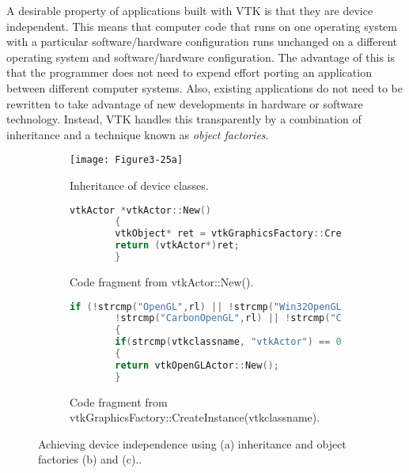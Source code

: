 A desirable property of applications built with VTK is that they are device independent. This means that computer code that runs on one operating system with a particular software/hardware configuration runs unchanged on a different operating system and software/hardware configuration. The advantage of this is that the programmer does not need to expend effort porting an application between different computer systems. Also, existing applications do not need to be rewritten to take advantage of new developments in hardware or software technology. Instead, VTK handles this transparently by a combination of inheritance and a technique known as \emph{object factories}.

\begin{figure}[!htb]
    \begin{subfigure}[h]{0.96\linewidth}
        \texttt{[image: Figure3-25a]}
        \caption{Inheritance of device classes.}
        \label{fig:Figure3-25a}
    \end{subfigure}
    \hfill
    \begin{subfigure}[h]{0.96\linewidth}
        \caption*{}
    \end{subfigure}
    \hfill
    \begin{subfigure}[h]{0.96\linewidth}
        \begin{lstlisting}[language=C++, caption={}]
        vtkActor *vtkActor::New()
        {
        vtkObject* ret = vtkGraphicsFactory::CreateInstance("vtkActor");
        return (vtkActor*)ret;
        }
        \end{lstlisting}
        \caption{Code fragment from vtkActor::New().}
        \label{fig:Figure3-25b}
    \end{subfigure}
    \hfill
    \begin{subfigure}[h]{0.96\linewidth}
        \caption*{}
    \end{subfigure}
    \hfill
    \begin{subfigure}[h]{0.96\linewidth}
        \begin{lstlisting}[language=C++, caption={}]
        if (!strcmp("OpenGL",rl) || !strcmp("Win32OpenGL",rl) ||
        !strcmp("CarbonOpenGL",rl) || !strcmp("CocoaOpenGL",rl))
        {
        if(strcmp(vtkclassname, "vtkActor") == 0)
        {
        return vtkOpenGLActor::New();
        }
        \end{lstlisting}
        \caption{Code fragment from vtkGraphicsFactory::CreateInstance(vtkclassname).}
        \label{fig:Figure3-25c}
    \end{subfigure}
    \caption{Achieving device independence using (a) inheritance and object factories (b) and (c)..}\label{fig:Figure3-25}
\end{figure}

